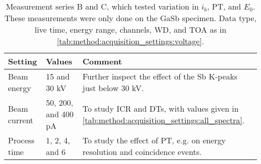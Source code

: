 \begin{table}[phtb]
    \begin{center}
        \caption{
            Measurement series B and C, which tested variation in $i_b$, PT, and $E_0$.
            These measurements were only done on the GaSb specimen.
            Data type, live time, energy range, channels, WD, and TOA as in \cref{tab:method:acquisition_settings:voltage}.
        }
        \renewcommand*{\arraystretch}{1.2}
        \label{tab:method:acquisition_settings:other}
        \begin{tabular}{p{2cm}p{3cm}p{8.6cm}}
            \hline
            \textbf{Setting} & \textbf{Values}     & \textbf{Comment}                                                                               \\
            \hline
            Beam energy      & 15 and 30 kV        & Further inspect the effect of the Sb K-peaks just below 30 kV.                                 \\
            Beam current     & 50, 200, and 400 pA & To study ICR and DTs, with values given in \cref{tab:method:acquisition_settings:all_spectra}. \\
            Process time     & 1, 2, 4, and 6      & To study the effect of PT, e.g. on energy resolution and coincidence events.                   \\
            \hline
        \end{tabular}
    \end{center}
\end{table}
